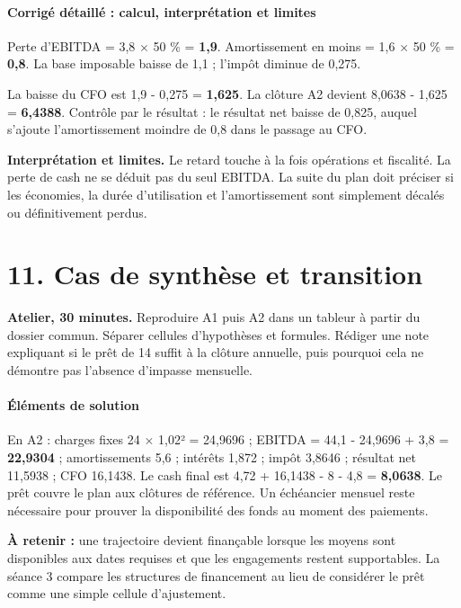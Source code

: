 \documentclass[12pt,a4paper]{article}
\begin{document}
\paragraph{Corrigé détaillé : calcul, interprétation et limites}
Perte d’EBITDA = 3,8 $\times$ 50 \% = \textbf{1,9}. Amortissement en moins = 1,6 $\times$ 50 \% = \textbf{0,8}. La base imposable baisse de 1,1 ; l’impôt diminue de 0,275.

La baisse du CFO est 1,9 - 0,275 = \textbf{1,625}. La clôture A2 devient 8,0638 - 1,625 = \textbf{6,4388}. Contrôle par le résultat : le résultat net baisse de 0,825, auquel s’ajoute l’amortissement moindre de 0,8 dans le passage au CFO.

\textbf{Interprétation et limites.} Le retard touche à la fois opérations et fiscalité. La perte de cash ne se déduit pas du seul EBITDA. La suite du plan doit préciser si les économies, la durée d’utilisation et l’amortissement sont simplement décalés ou définitivement perdus.

\section*{11. Cas de synthèse et transition}
\textbf{Atelier, 30 minutes.} Reproduire A1 puis A2 dans un tableur à partir du dossier commun. Séparer cellules d’hypothèses et formules. Rédiger une note expliquant si le prêt de 14 suffit à la clôture annuelle, puis pourquoi cela ne démontre pas l’absence d’impasse mensuelle.



\paragraph{Éléments de solution}
En A2 : charges fixes 24 $\times$ 1,02² = 24,9696 ; EBITDA = 44,1 - 24,9696 + 3,8 = \textbf{22,9304} ; amortissements 5,6 ; intérêts 1,872 ; impôt 3,8646 ; résultat net 11,5938 ; CFO 16,1438. Le cash final est 4,72 + 16,1438 - 8 - 4,8 = \textbf{8,0638}. Le prêt couvre le plan aux clôtures de référence. Un échéancier mensuel reste nécessaire pour prouver la disponibilité des fonds au moment des paiements.


\textbf{À retenir :} une trajectoire devient finançable lorsque les moyens sont disponibles aux dates requises et que les engagements restent supportables. La séance 3 compare les structures de financement au lieu de considérer le prêt comme une simple cellule d’ajustement.
\end{document}
